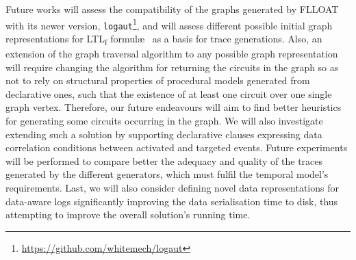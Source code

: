 \documentclass[acmengage]{acmart}
\newcommand{\LTLf}{\textup{LTL}\textsubscript{f}\xspace}
\begin{document}
Future works will assess the compatibility of the graphs generated by FLLOAT with its newer version, \texttt{logaut}\footnote{\url{https://github.com/whitemech/logaut}}, and will assess different possible initial graph representations for \LTLf formul\ae~ as a basis for trace generations. Also, an extension of the graph traversal algorithm to any possible graph representation will require changing the algorithm for returning the circuits in the graph so as not to rely on structural properties of procedural models generated from declarative ones, such that the existence of at least one circuit over one single graph vertex. Therefore, our future endeavours will aim to find better heuristics for generating some circuits occurring in the graph. We will also investigate extending such a solution by supporting declarative clauses expressing data correlation conditions between activated and targeted events.  Future experiments will be performed to compare better the adequacy and quality of the traces generated by the different generators, which must fulfil the temporal model's requirements. Last, we will also consider defining novel data representations for data-aware logs significantly improving the data serialisation time to disk, thus attempting to improve the overall solution's running time.




\end{document}
